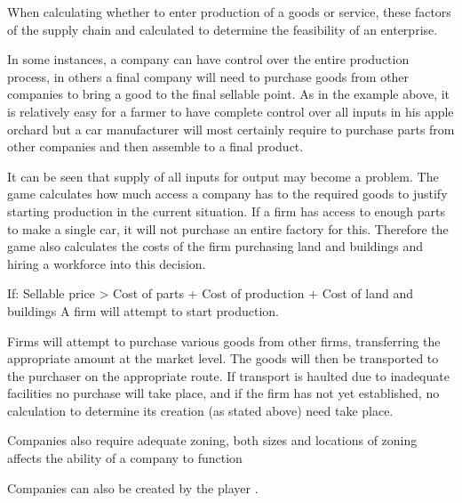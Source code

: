 When calculating whether to enter production of a goods or service, these factors of the supply chain and calculated to determine the feasibility of an enterprise.

In some instances, a company can have control over the entire production process, in others a final company will need to purchase goods from other companies to bring a good to the final sellable point. As in the example above, it is relatively easy for a farmer to have complete control over all inputs in his apple orchard but a car manufacturer will most certainly require to purchase parts from other companies and then assemble to a final product.

It can be seen that supply of all inputs for output may become a problem. The game calculates how much access a company has to the required goods to justify starting production in the current situation. If a firm has access to enough parts to make a single car, it will not purchase an entire factory for this. Therefore the game also calculates the costs of the firm purchasing land and buildings and hiring a workforce into this decision.

If: Sellable price  > Cost of parts + Cost of production + Cost of land and buildings
A firm will attempt to start production.        


Firms will attempt to purchase various goods from other firms, transferring the appropriate amount at the market level. The goods will then be transported to the purchaser on the appropriate route. If transport is haulted due to inadequate facilities no purchase will take place, and if the firm has not yet established, no calculation to determine its creation (as stated above) need take place.





Companies also require adequate zoning, both sizes and locations of zoning affects the ability of a company to function 







Companies can also be created by the player .










